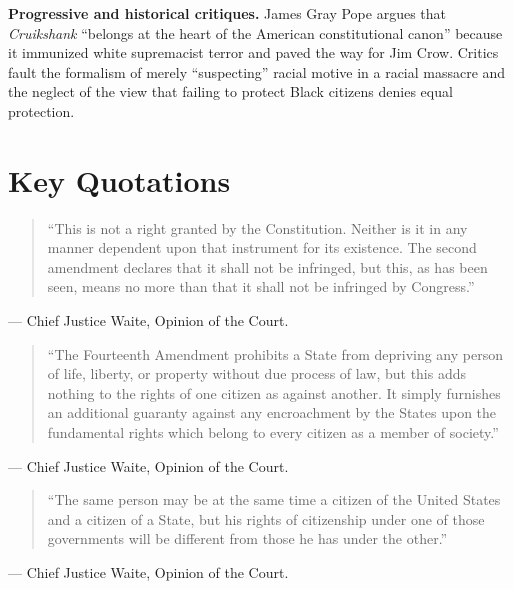 \documentclass[12pt]{article}
\begin{document}
\textbf{Progressive and historical critiques.} James Gray Pope argues that \textit{Cruikshank} ``belongs at the heart of the American constitutional canon'' because it immunized white supremacist terror and paved the way for Jim Crow. Critics fault the formalism of merely ``suspecting'' racial motive in a racial massacre and the neglect of the view that failing to protect Black citizens denies equal protection.

\section{Key Quotations}

\begin{quote}
``This is not a right granted by the Constitution. Neither is it in any manner dependent upon that instrument for its existence. The second amendment declares that it shall not be infringed, but this, as has been seen, means no more than that it shall not be infringed by Congress.''
\end{quote}
\noindent --- Chief Justice Waite, Opinion of the Court.

\begin{quote}
``The Fourteenth Amendment prohibits a State from depriving any person of life, liberty, or property without due process of law, but this adds nothing to the rights of one citizen as against another. It simply furnishes an additional guaranty against any encroachment by the States upon the fundamental rights which belong to every citizen as a member of society.''
\end{quote}
\noindent --- Chief Justice Waite, Opinion of the Court.

\begin{quote}
``The same person may be at the same time a citizen of the United States and a citizen of a State, but his rights of citizenship under one of those governments will be different from those he has under the other.''
\end{quote}
\noindent --- Chief Justice Waite, Opinion of the Court.
\end{document}
